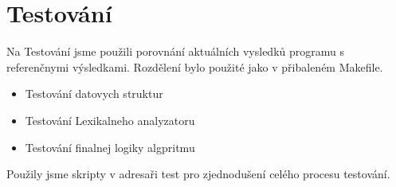 \section{Testování}

Na Testování jsme použili porovnání aktuálních vysledků programu s referenčnymi výsledkami.
Rozdělení bylo použité jako v přibaleném Makefile.

\begin{itemize}
    \item Testování datovych struktur
    \item Testování Lexikalneho analyzatoru
    \item Testování finalnej logiky algpritmu
\end{itemize}

Použily jsme skripty v adresaři test pro zjednodušení celého procesu testování.
